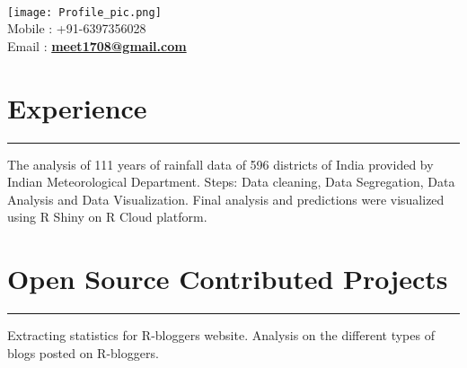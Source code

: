 \documentclass[]{meetresume-class}
\begin{document}
	\begin{minipage}[t]{0.66\textwidth} 
		\hspace*{0pt}\hfill    \\
		\hspace*{0pt}\hfill \texttt{[image: Profile\_pic.png]}\\
		\hspace*{0pt}\hfill Mobile : +91-6397356028 \\
		\hspace*{0pt}\hfill Email : \textbf{\href{mailto:meet1708@gmail.com}{meet1708@gmail.com}}
		\section{Experience}
		\noindent\rule{12.5cm}{0.4pt}
		 
		\noindent
		\hspace{7em}%
		\begin{minipage}{0.76\textwidth\vspace{2pt}}
			The analysis of 111 years of rainfall data of 596 districts of India provided by Indian Meteorological Department. Steps: Data cleaning, Data Segregation, Data Analysis and Data Visualization.  Final analysis and predictions were visualized using R Shiny on R Cloud platform.
		\end{minipage}
		\sectionsep
		
		\section{Open Source Contributed Projects} 
		\noindent\rule{12.5cm}{0.4pt}
		 
		\descript{}
		\noindent
		\hspace{6em}%
		\begin{minipage}{0.80\textwidth\vspace{2pt}}
			Extracting statistics for R-bloggers website. Analysis on the different types of blogs posted on R-bloggers.
		\end{minipage}
		\sectionsep
		

\end{minipage}
\end{document}

